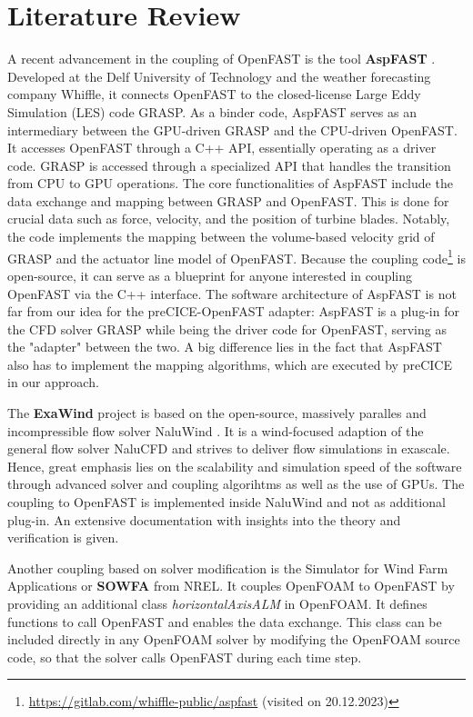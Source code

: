 \section{Literature Review}
\label{section:review}

A recent advancement in the coupling of OpenFAST is the tool \textbf{AspFAST} \cite{Taschner:2022}. Developed at the Delf University of Technology and the weather forecasting company Whiffle, it connects OpenFAST to the closed-license Large Eddy Simulation (LES) code GRASP. 
As a binder code, AspFAST serves as an intermediary between the GPU-driven GRASP and the CPU-driven OpenFAST. It accesses OpenFAST through a C++ API, essentially operating as a driver code. GRASP is accessed through a specialized API that handles the transition from CPU to GPU operations.
The core functionalities of AspFAST include the data exchange and mapping between GRASP and OpenFAST. This is done for crucial data such as force, velocity, and the position of turbine blades. Notably, the code implements the mapping between the volume-based velocity grid of GRASP and the actuator line model of OpenFAST. Because the coupling  code\footnote{\url{https://gitlab.com/whiffle-public/aspfast} (visited on 20.12.2023)} is open-source, it can serve as a blueprint for anyone interested in coupling OpenFAST via the C++ interface.
The software architecture of AspFAST is not far from our idea for the preCICE-OpenFAST adapter: AspFAST is a plug-in for the CFD solver GRASP while being the driver code for OpenFAST, serving as the "adapter" between the two. A big difference lies in the fact that AspFAST also has to implement the mapping algorithms, which are executed by preCICE in our approach.

The \textbf{ExaWind} project \cite{Sprague:2019} is based on the open-source, massively paralles and incompressible flow solver NaluWind \cite{Ananthan:2019}. It is a wind-focused adaption of the general flow solver NaluCFD and strives to deliver flow simulations in exascale. Hence, great emphasis lies on the scalability and simulation speed of the software through advanced solver and coupling algorihtms as well as the use of GPUs. The coupling to OpenFAST is implemented inside NaluWind and not as additional plug-in. An extensive documentation with insights into the theory and verification is given. 

Another coupling based on solver modification is the Simulator for Wind Farm Applications or \textbf{SOWFA} \cite{Churchfield:2012} from NREL. It couples OpenFOAM to OpenFAST by providing an additional  class \textit{horizontalAxisALM} in OpenFOAM. It defines functions to call OpenFAST and enables the data exchange. This class can be included directly in any OpenFOAM solver by modifying the OpenFOAM source code, so that the solver calls OpenFAST during each time step.

